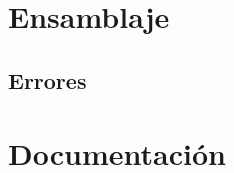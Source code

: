 \section{Ensamblaje}\label{ApendiceEnsamblaje}
\subsection{Errores}\label{ApendiceEnsamblajeErrores}

\section{Documentación}\label{ApendiceDocumentacion}
